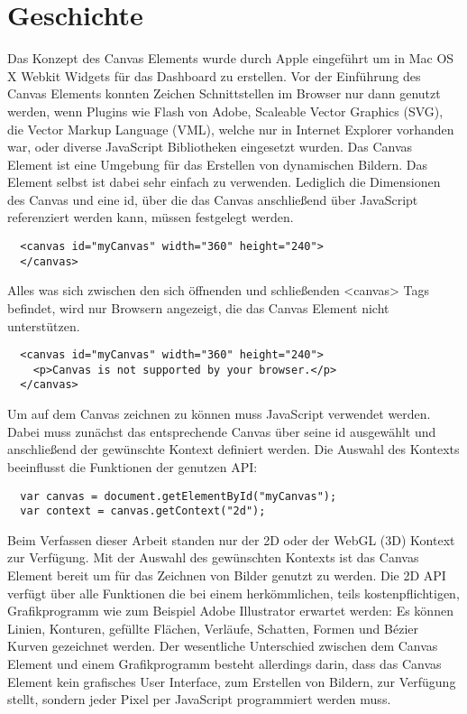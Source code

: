 \section{Geschichte}
Das Konzept des Canvas Elements wurde durch Apple eingeführt um in Mac OS X
Webkit Widgets für das Dashboard zu erstellen. Vor der Einführung des Canvas
Elements konnten Zeichen Schnittstellen im Browser nur dann genutzt werden,
wenn Plugins wie Flash von Adobe, Scaleable Vector Graphics (SVG), die
Vector Markup Language (VML), welche nur in Internet Explorer vorhanden war,
oder diverse JavaScript Bibliotheken eingesetzt wurden. %
\newline
Das Canvas Element ist eine Umgebung für das Erstellen von dynamischen Bildern.
Das Element selbst ist dabei sehr einfach zu verwenden. Lediglich die
Dimensionen des Canvas und eine id, über die das Canvas anschließend über
JavaScript referenziert werden kann, müssen festgelegt werden.
%
\lstset{style=HTML5}
\begin{lstlisting}
  <canvas id="myCanvas" width="360" height="240">
  </canvas>
\end{lstlisting}
%
Alles was sich zwischen den sich öffnenden und schließenden <canvas> Tags
befindet, wird nur Browsern angezeigt, die das Canvas Element nicht
unterstützen.
%
\begin{lstlisting}
  <canvas id="myCanvas" width="360" height="240">
    <p>Canvas is not supported by your browser.</p>
  </canvas>
\end{lstlisting}
%
Um auf dem Canvas zeichnen zu können muss JavaScript verwendet werden. Dabei
muss zunächst das entsprechende Canvas über seine id ausgewählt und
anschließend der gewünschte Kontext definiert werden. Die Auswahl des Kontexts
beeinflusst die Funktionen der genutzen API:
%
\lstset{style=JavaScript}
\begin{lstlisting}
  var canvas = document.getElementById("myCanvas");
  var context = canvas.getContext("2d");
\end{lstlisting}
%
Beim Verfassen dieser Arbeit standen nur der 2D oder der WebGL (3D) Kontext zur
Verfügung. Mit der Auswahl des gewünschten Kontexts ist das Canvas Element
bereit um für das Zeichnen von Bilder genutzt zu werden. Die 2D API verfügt
über alle Funktionen die bei einem herkömmlichen, teils kostenpflichtigen,
Grafikprogramm wie zum Beispiel Adobe Illustrator erwartet werden: Es können
Linien, Konturen, gefüllte Flächen, Verläufe, Schatten, Formen und Bézier
Kurven gezeichnet werden. Der wesentliche Unterschied zwischen dem Canvas
Element und einem Grafikprogramm besteht allerdings darin, dass das Canvas
Element kein grafisches User Interface, zum Erstellen von Bildern, zur
Verfügung stellt, sondern jeder Pixel per JavaScript programmiert werden muss.


